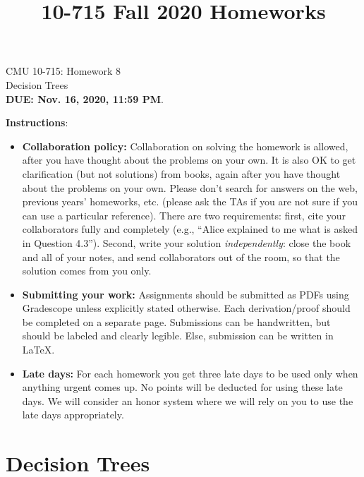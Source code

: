 \documentclass{article}
\title{10-715 Fall 2020 Homeworks}
\begin{document}

\begin{center}
{\Large CMU 10-715: Homework 8}\\
Decision Trees \\
{\bf DUE: Nov. 16, 2020, 11:59 PM}.\\
\end{center}


\textbf{\large Instructions}:
\begin{itemize}
    \item \textbf{Collaboration policy:} Collaboration on solving the homework is allowed, after you have thought about the problems on your own. It is also OK to get clarification (but not solutions) from books, again after you have thought about the problems on your own. Please don’t search for answers on the web, previous years’ homeworks, etc. (please ask the TAs if you are not sure if you can use a particular reference). There are two requirements: first, cite your collaborators fully and completely (e.g., ``Alice explained to me what is asked in Question 4.3''). Second, write your solution \emph{independently}: close the book and all of your notes, and send collaborators out of the room, so that the solution comes from you only. 
    \item \textbf{Submitting your work:} Assignments should be submitted as PDFs using Gradescope unless explicitly stated otherwise. Each derivation/proof should be completed on a separate page. Submissions can be handwritten, but should be labeled and clearly legible. Else, submission can be written in LaTeX.
    
    \item \textbf{Late days:} For each homework you get three late days to be used only when anything urgent comes up. No points will be deducted for using these late days. We will consider an honor system where we will rely on you to use the late days appropriately.
    

\end{itemize}

\newpage
\section{Decision Trees}
\end{document}
